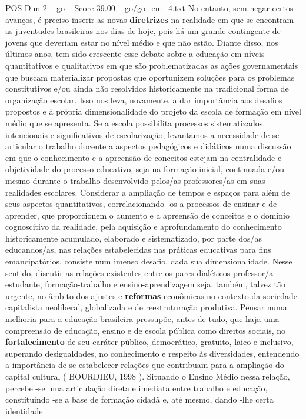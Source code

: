 \begin{textsample}{POS Dim 2 – go – Score 39.00 – go/go\_em\_4.txt}
No entanto, sem negar certos avanços, é preciso inserir as novas \textbf{diretrizes} na realidade em que se encontram as juventudes brasileiras nos dias de hoje, pois há um grande contingente de jovens que deveriam estar no nível médio e que não estão.
Diante disso, nos últimos anos, tem sido crescente esse debate sobre a educação em níveis quantitativos e qualitativos em que são problematizadas as ações governamentais que buscam materializar propostas que oportunizem soluções para os problemas constitutivos e/ou ainda não resolvidos historicamente na tradicional forma de organização escolar.
Isso nos leva, novamente, a dar importância aos desafios propostos e à própria dimensionalidade do projeto da escola de formação em nível médio que se apresenta.
Se a escola possibilita processos sistematizados, intencionais e significativos de escolarização, levantamos a necessidade de se articular o trabalho docente a aspectos pedagógicos e didáticos numa discussão em que o conhecimento e a apreensão de conceitos estejam na centralidade e objetividade do processo educativo, seja na formação inicial, continuada e/ou mesmo durante o trabalho desenvolvido pelos/as professores/as em suas realidades escolares.
Considerar a ampliação de tempos e espaços para além de seus aspectos quantitativos, correlacionando -os a processos de ensinar e de aprender, que proporcionem o aumento e a apreensão de conceitos e o domínio cognoscitivo da realidade, pela aquisição e aprofundamento do conhecimento historicamente acumulado, elaborado e sistematizado, por parte dos/as educandos/as, nas relações estabelecidas nas práticas educativas para fins emancipatórios, consiste num imenso desafio, dada sua dimensionalidade.
Nesse sentido, discutir as relações existentes entre os pares dialéticos professor/a-estudante, formação-trabalho e ensino-aprendizagem seja, também, talvez tão urgente, no âmbito dos ajustes e \textbf{reformas} econômicas no contexto da sociedade capitalista neoliberal, globalizada e de reestruturação produtiva.
Pensar numa melhoria para a educação brasileira pressupõe, antes de tudo, que haja uma compreensão de educação, ensino e de escola pública como direitos sociais, no \textbf{fortalecimento} de seu caráter público, democrático, gratuito, laico e inclusivo, superando desigualdades, no conhecimento e respeito às diversidades, entendendo a importância de se estabelecer relações que contribuam para a ampliação do capital cultural ( BOURDIEU, 1998 ).
Situando o Ensino Médio nessa relação, percebe -se uma articulação direta e imediata entre trabalho e educação, constituindo -se a base de formação cidadã e, até mesmo, dando -lhe certa identidade.

\end{textsample}
